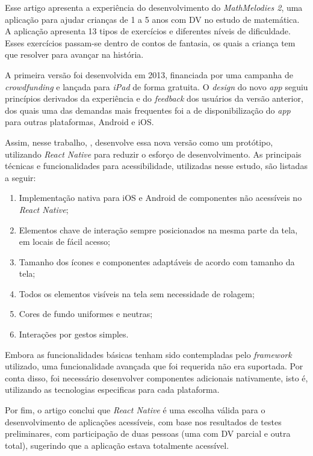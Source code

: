 Esse artigo apresenta a experiência do desenvolvimento do \emph{MathMelodies 2}, uma aplicação para ajudar crianças de 1 a 5 anos com DV no estudo de matemática.
A aplicação apresenta 13 tipos de exercícios e diferentes níveis de dificuldade.
Esses exercícios passam-se dentro de contos de fantasia, os quais a criança tem que resolver para avançar na história.

A primeira versão foi desenvolvida em 2013, financiada por uma campanha de \emph{crowdfunding} e lançada para \emph{iPad} de forma gratuita.
O \emph{design} do novo \emph{app} seguiu princípios derivados da experiência e do \emph{feedback} dos usuários da versão anterior, dos quais
uma das demandas mais frequentes foi a de disponibilização do \emph{app} para outras plataformas, Android e iOS\@.

Assim, nesse trabalho, , desenvolve essa nova versão como um protótipo, utilizando \emph{React Native} para reduzir o esforço de desenvolvimento.
As principais técnicas e funcionalidades para acessibilidade, utilizadas nesse estudo, são listadas a seguir:

\begin{enumerate}
  \item Implementação nativa para iOS e Android de componentes não acessíveis no \emph{React Native};
  \item Elementos chave de interação sempre posicionados na mesma parte da tela, em locais de fácil acesso;
  \item Tamanho dos ícones e componentes adaptáveis de acordo com tamanho da tela;
  \item Todos os elementos visíveis na tela sem necessidade de rolagem;
  \item Cores de fundo uniformes e neutras;
  \item Interações por gestos simples.
\end{enumerate}

Embora as funcionalidades básicas tenham sido contempladas pelo \emph{framework} utilizado, uma funcionalidade avançada que foi requerida não era suportada.
Por conta disso, foi necessário desenvolver componentes adicionais nativamente, isto é, utilizando as tecnologias especificas para cada plataforma.

Por fim, o artigo conclui que \emph{React Native} é uma escolha válida para o desenvolvimento de aplicações acessíveis,
com base nos resultados de testes preliminares, com participação de duas pessoas (uma com DV parcial e outra total), sugerindo que a aplicação estava totalmente acessível.

